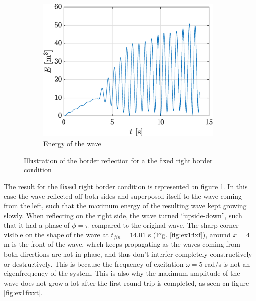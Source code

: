 \documentclass[a4paper,12pt,twoside]{article}
\begin{document}
\begin{figure}[h!]
    \centering
    \begin{subfigure}{0.5\textwidth}
    \includegraphics[width=\textwidth]{graphs/ex1Efixe.eps}
    \caption{Energy of the wave}
    \end{subfigure}

    \caption{Illustration of the border reflection for a the fixed right border condition}
    \label{fig:ex1fix}
    \end{figure}

    The result for the \textbf{fixed} right border condition is represented on figure \ref{fig:ex1fix}. In this case the wave reflected off both sides and superposed itself to the wave coming from the left, such that the maximum energy of the resulting wave kept growing slowly. When reflecting on the right side, the wave turned ``upside-down'', such that it had a phase of $\phi=\pi$ compared to the original wave. The sharp corner visible on the shape of the wave at $t_{fin} = 14.01$ s (Fig. \ref{fig:ex1fixf}), around $x=4$ m is the front of the wave, which keeps propagating as the waves coming from both directions are not in phase, and thus don't interfer completely constructively or destructively. This is because the frequency of excitation $\omega=5$ rad/s is not an eigenfrequency of the system. This is also why the maximum amplitude of the wave does not grow a lot after the first round trip is completed, as seen on figure \ref{fig:ex1fixxt}.
\end{document}

